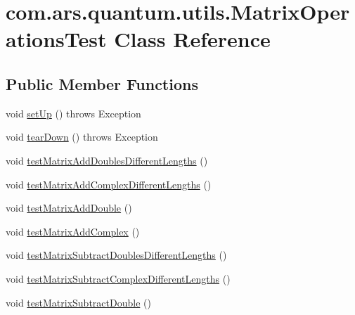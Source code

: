 \hypertarget{classcom_1_1ars_1_1quantum_1_1utils_1_1_matrix_operations_test}{}\section{com.\+ars.\+quantum.\+utils.\+Matrix\+Operations\+Test Class Reference}
\label{classcom_1_1ars_1_1quantum_1_1utils_1_1_matrix_operations_test}
\subsection*{Public Member Functions}
\begin{DoxyCompactItemize}
\item 
void \hyperlink{classcom_1_1ars_1_1quantum_1_1utils_1_1_matrix_operations_test_a10e65a668d518544cd556193de505348}{set\+Up} ()  throws Exception 
\item 
void \hyperlink{classcom_1_1ars_1_1quantum_1_1utils_1_1_matrix_operations_test_a4c7ef10675db9e4cf278ef3d4c88dc75}{tear\+Down} ()  throws Exception 
\item 
void \hyperlink{classcom_1_1ars_1_1quantum_1_1utils_1_1_matrix_operations_test_a95be19fcaf80e4fa48732d3a03c55afc}{test\+Matrix\+Add\+Doubles\+Different\+Lengths} ()
\item 
void \hyperlink{classcom_1_1ars_1_1quantum_1_1utils_1_1_matrix_operations_test_a6a11674dd3048492205cfcbd810650a4}{test\+Matrix\+Add\+Complex\+Different\+Lengths} ()
\item 
void \hyperlink{classcom_1_1ars_1_1quantum_1_1utils_1_1_matrix_operations_test_a9dd0cf555f9f6a02e67c400bd2ef6e8b}{test\+Matrix\+Add\+Double} ()
\item 
void \hyperlink{classcom_1_1ars_1_1quantum_1_1utils_1_1_matrix_operations_test_aad67e722c86ac9893a746e586e76e6c6}{test\+Matrix\+Add\+Complex} ()
\item 
void \hyperlink{classcom_1_1ars_1_1quantum_1_1utils_1_1_matrix_operations_test_a5ea063677df577695471228de2a4b6bf}{test\+Matrix\+Subtract\+Doubles\+Different\+Lengths} ()
\item 
void \hyperlink{classcom_1_1ars_1_1quantum_1_1utils_1_1_matrix_operations_test_af0c58a11a8b195509365a0f786041c86}{test\+Matrix\+Subtract\+Complex\+Different\+Lengths} ()
\item 
void \hyperlink{classcom_1_1ars_1_1quantum_1_1utils_1_1_matrix_operations_test_a531e80f804f35d3f8fd8d35eab4b4faa}{test\+Matrix\+Subtract\+Double} ()
\item 

\end{DoxyCompactItemize}
